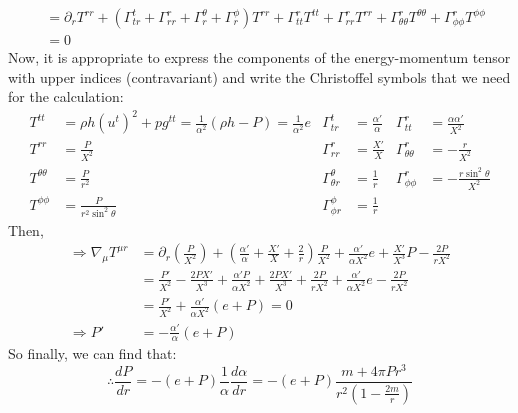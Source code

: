 \documentclass[12pt]{report}
\begin{document}
\begin{enumerate}
\begin{align*}
			&= \partial_r T^{rr} + \left(\Gamma^t_{tr} + \Gamma^r_{rr} + \Gamma^\theta_{r} + \Gamma^\phi_r\right)T^{rr}+ \Gamma^r_{tt}T^{tt} + \Gamma^r_{rr}T^{rr} + \Gamma^r_{\theta\theta}T^{\theta\theta} + \Gamma^r_{\phi\phi}T^{\phi\phi}\\
			&= 0
		\end{align*}
		Now, it is appropriate to express the components of the energy-momentum tensor with upper indices (contravariant) and write the Christoffel symbols that we need for the calculation:
		\begin{align*}
			T^{tt} &= \rho h\left(u^t\right)^2 + pg^{tt} = \frac{1}{\alpha^2}(\rho h - P) = \frac{1}{\alpha^2}e & \Gamma^t_{tr} &= \frac{\alpha'}{\alpha} & \Gamma^r_{tt} &= \frac{\alpha\alpha'}{X^2} \\
			T^{rr} &= \frac{P}{X^2} & \Gamma^r_{rr} &= \frac{X'}{X} & \Gamma^r_{\theta\theta} &= -\frac{r}{X^2} \\
			T^{\theta\theta} &= \frac{P}{r^2} & \Gamma^\theta_{\theta r} &= \frac{1}{r} & \Gamma^r_{\phi\phi} &= -\frac{r\sin^2\theta}{X^2} \\
			T^{\phi\phi} &= \frac{P}{r^2\sin^2\theta} & \Gamma^\phi_{\phi r} &= \frac{1}{r}
		\end{align*}
		Then,
		\begin{align*}
			\Rightarrow \nabla_\mu T^{\mu r} &= \partial_r\left(\frac{P}{X^2}\right) + \left(\frac{\alpha'}{\alpha} + \frac{X'}{X} + \frac{2}{r}\right)\frac{P}{X^2} + \frac{\alpha'}{\alpha X^2}e + \frac{X'}{X^3}P - \frac{2P}{rX^2} \\
			&= \frac{P'}{X^2} - \frac{2PX'}{X^3} + \frac{\alpha'P}{\alpha X^2} + \frac{2PX'}{X^3} + \frac{2P}{rX^2} + \frac{\alpha'}{\alpha X^2}e - \frac{2P}{rX^2} \\
			&= \frac{P'}{X^2} + \frac{\alpha'}{\alpha X^2}(e+P) = 0 \\
			\Rightarrow P' &= -\frac{\alpha'}{\alpha}(e + P)
		\end{align*}
		So finally, we can find that:
		\begin{equation*}
			\therefore \boxed{\frac{dP}{dr} = -(e+P)\frac{1}{\alpha}\frac{d\alpha}{dr} = -(e+P)\frac{m + 4\pi Pr^3}{r^2\left(1-\frac{2m}{r}\right)}}
		\end{equation*}
	\end{enumerate}
	
	
	
	\nocite{*}
	
\end{document}
